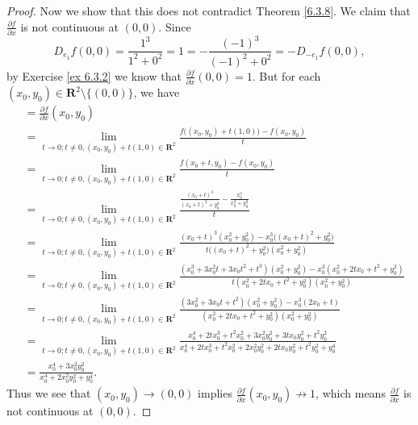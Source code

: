 \begin{proof}
    Now we show that this does not contradict Theorem \ref{6.3.8}.
    We claim that \(\frac{\partial f}{\partial x}\) is not continuous at \((0, 0)\).
    Since
    \[
        D_{e_1} f(0, 0) = \frac{1^3}{1^2 + 0^2} = 1 = -\frac{(-1)^3}{(-1)^2 + 0^2} = -D_{-e_1} f(0, 0),
    \]
    by Exercise \ref{ex 6.3.2} we know that \(\frac{\partial f}{\partial x}(0, 0) = 1\).
    But for each \((x_0, y_0) \in \mathbf{R}^2 \setminus \{(0, 0)\}\), we have
    \begin{align*}
         & = \frac{\partial f}{\partial x}(x_0, y_0)                                                                                                                                                                                              \\
         & = \lim_{t \to 0 ; t \neq 0, (x_0, y_0) + t(1, 0) \in \mathbf{R}^2} \frac{f\big((x_0, y_0) + t(1, 0)\big) - f(x_0, y_0)}{t}                                                                                                             \\
         & = \lim_{t \to 0 ; t \neq 0, (x_0, y_0) + t(1, 0) \in \mathbf{R}^2} \frac{f(x_0 + t, y_0) - f(x_0, y_0)}{t}                                                                                                                             \\
         & = \lim_{t \to 0 ; t \neq 0, (x_0, y_0) + t(1, 0) \in \mathbf{R}^2} \frac{\frac{(x_0 + t)^3}{(x_0 + t)^2 + y_0^2} - \frac{x_0^3}{x_0^2 + y_0^2}}{t}                                                                                     \\
         & = \lim_{t \to 0 ; t \neq 0, (x_0, y_0) + t(1, 0) \in \mathbf{R}^2} \frac{(x_0 + t)^3 (x_0^2 + y_0^2) - x_0^3 \big((x_0 + t)^2 + y_0^2\big)}{t \big((x_0 + t)^2 + y_0^2\big) (x_0^2 + y_0^2)}                                           \\
         & = \lim_{t \to 0 ; t \neq 0, (x_0, y_0) + t(1, 0) \in \mathbf{R}^2} \frac{(x_0^3 + 3 x_0^2 t + 3 x_0 t^2 + t^3) (x_0^2 + y_0^2) - x_0^3 (x_0^2 + 2 t x_0 + t^2 + y_0^2)}{t (x_0^2 + 2 t x_0 + t^2 + y_0^2) (x_0^2 + y_0^2)}             \\
         & = \lim_{t \to 0 ; t \neq 0, (x_0, y_0) + t(1, 0) \in \mathbf{R}^2} \frac{(3 x_0^2 + 3 x_0 t + t^2) (x_0^2 + y_0^2) - x_0^3 (2 x_0 + t)}{(x_0^2 + 2 t x_0 + t^2 + y_0^2) (x_0^2 + y_0^2)}                                               \\
         & = \lim_{t \to 0 ; t \neq 0, (x_0, y_0) + t(1, 0) \in \mathbf{R}^2} \frac{x_0^4 + 2 t x_0^3 + t^2 x_0^2 + 3 x_0^2 y_0^2 + 3 t x_0 y_0^2 + t^2 y_0^2}{x_0^4 + 2 t x_0^3 + t^2 x_0^2 + 2 x_0^2 y_0^2 + 2 t x_0 y_0^2 + t^2 y_0^2 + y_0^4} \\
         & = \frac{x_0^4 + 3 x_0^2 y_0^2}{x_0^4 + 2 x_0^2 y_0^2 + y_0^4}.
    \end{align*}
    Thus we see that \((x_0, y_0) \to (0, 0)\) implies \(\frac{\partial f}{\partial x}(x_0, y_0) \not\to 1\), which means \(\frac{\partial f}{\partial x}\) is not continuous at \((0, 0)\).
\end{proof}

